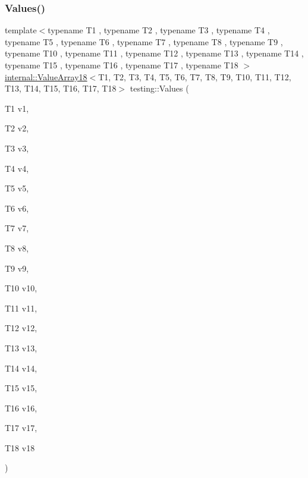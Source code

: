 \subsubsection{\texorpdfstring{Values()}{Values()}\hspace{0.1cm}{\footnotesize\ttfamily [18/50]}}
{\footnotesize\ttfamily template$<$typename T1 , typename T2 , typename T3 , typename T4 , typename T5 , typename T6 , typename T7 , typename T8 , typename T9 , typename T10 , typename T11 , typename T12 , typename T13 , typename T14 , typename T15 , typename T16 , typename T17 , typename T18 $>$ \\
\mbox{\hyperlink{classtesting_1_1internal_1_1ValueArray18}{internal\+::\+Value\+Array18}}$<$T1, T2, T3, T4, T5, T6, T7, T8, T9, T10, T11, T12, T13, T14, T15, T16, T17, T18$>$ testing\+::\+Values (\begin{DoxyParamCaption}\item[{T1}]{v1,  }\item[{T2}]{v2,  }\item[{T3}]{v3,  }\item[{T4}]{v4,  }\item[{T5}]{v5,  }\item[{T6}]{v6,  }\item[{T7}]{v7,  }\item[{T8}]{v8,  }\item[{T9}]{v9,  }\item[{T10}]{v10,  }\item[{T11}]{v11,  }\item[{T12}]{v12,  }\item[{T13}]{v13,  }\item[{T14}]{v14,  }\item[{T15}]{v15,  }\item[{T16}]{v16,  }\item[{T17}]{v17,  }\item[{T18}]{v18 }\end{DoxyParamCaption})}

\mbox{\label{namespacetesting_a673757dbfc048bbb48e459485b30b2bf}} 
